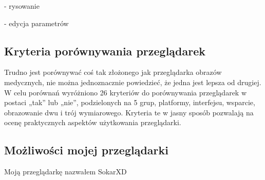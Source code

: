 - rysowanie

- edycja parametrów


\subsection{Kryteria porównywania przeglądarek}

Trudno jest porównywać coś tak złożonego jak przeglądarka obrazów medycznych, nie można jednoznacznie powiedzieć, że jedna jest lepsza od drugiej.
W celu porównań wyróżniono 26 kryteriów do porównywania przeglądarek w postaci „tak” lub „nie”, podzielonych na 5 grup, platformy, interfejsu, wsparcie, obrazowanie dwu i trój wymiarowego.
Kryteria te w jasny sposób pozwalają na ocenę praktycznych aspektów użytkowania przeglądarki.

\subsection{Możliwości mojej przeglądarki}

Moją przeglądarkę nazwałem SokarXD
